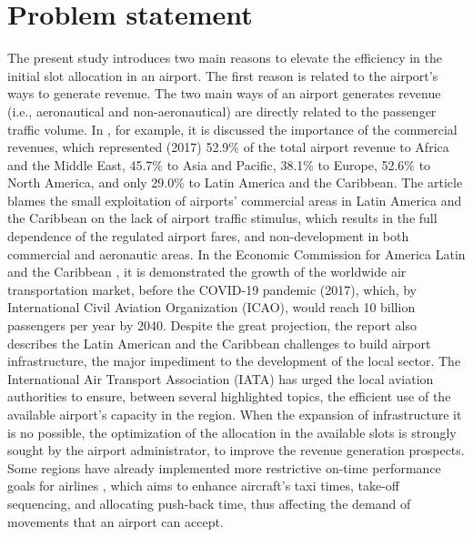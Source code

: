 \section{Problem statement}
\label{probl}

The present study introduces two main reasons to elevate the efficiency in the initial slot allocation in an airport. The first reason is related to the airport's ways to generate revenue. The two main ways of an airport generates revenue (i.e., aeronautical and non-aeronautical) are directly related to the passenger traffic volume. In \cite{graham2009important}, for example, it is discussed the importance of the commercial revenues, which represented (2017) 52.9\% of the total airport revenue to Africa and the Middle East, 45.7\% to Asia and Pacific, 38.1\% to Europe, 52.6\% to North America, and only 29.0\% to Latin America and the Caribbean. The article blames the small exploitation of airports' commercial areas in Latin America and the Caribbean on the lack of airport traffic stimulus, which results in the full dependence of the regulated airport fares, and non-development in both commercial and aeronautic areas.
In the Economic Commission for America Latin and the Caribbean \cite{planzer2019airport}, it is demonstrated the growth of the worldwide air transportation market, before the COVID-19 pandemic (2017), which, by International Civil Aviation Organization (ICAO), would reach 10 billion passengers per year by 2040. Despite the great projection, the report also describes the Latin American and the Caribbean challenges to build airport infrastructure, the major impediment to the development of the local sector. The International Air Transport Association (IATA) has urged the local aviation authorities to ensure, between several highlighted topics, the efficient use of the available airport’s capacity in the region. When the expansion of infrastructure it is no possible, the optimization of the allocation in the available slots is strongly sought by the airport administrator, to improve the revenue generation prospects. Some regions have already implemented more restrictive on-time performance goals for airlines \cite{ravizza2014aircraft}, which aims to enhance aircraft's taxi times, take-off sequencing, and allocating push-back time, thus affecting the demand of movements that an airport can accept.

